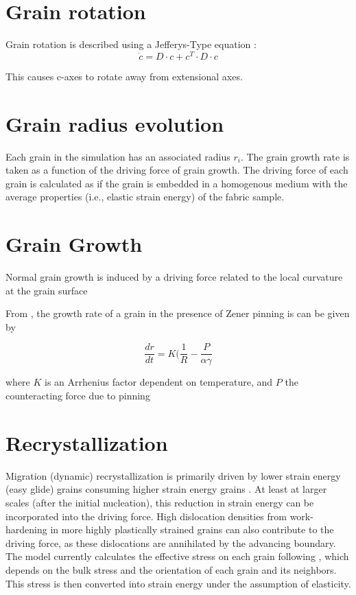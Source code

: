 \documentclass{article}
\begin{document}
\section{Grain rotation}
Grain rotation is described using a Jefferys-Type equation \citep{azuma94}:
\begin{equation}

\dot{c} = D \cdot c + c^T \cdot D \cdot c
\end{equation}

This causes c-axes to rotate away from extensional axes.
\section{Grain radius evolution}
Each grain in the simulation has an associated radius $r_i$. The grain growth rate is taken as a function of the driving force of grain growth. The driving force of each grain is calculated as if the grain is embedded in a homogenous medium with the average properties (i.e., elastic strain energy) of the fabric sample.

\section{Grain Growth}
Normal grain growth is induced by a driving force related to the local curvature at the grain surface

From \citet{durand2005}, the growth rate of a grain in the presence of Zener pinning is can be given by

\begin{equation}
\frac{dr}{dt} = K(\frac{1}{R}-\frac{P}{\alpha \gamma}
\end{equation}

where $K$ is an Arrhenius factor dependent on temperature, and $P$ the counteracting force due to pinning

\section{Recrystallization}
Migration (dynamic) recrystallization is primarily driven by lower strain energy (easy glide) grains consuming higher strain energy grains \citep{duval1995}. At least at larger scales (after the initial nucleation), this reduction in strain energy can be incorporated into the driving force. High dislocation densities from work-hardening in more highly plastically strained grains can also contribute to the driving force, as these dislocations are annihilated by the advancing boundary. The model currently calculates the effective stress on each grain following \citet{azuma96}, which depends on the bulk stress and the orientation of each grain and its neighbors. This stress is then converted into strain energy under the assumption of elasticity.



\end{document}
